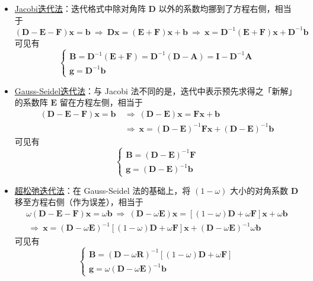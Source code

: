 \documentclass[opensource,b5paper,sourcefont]{qyxf-book}
\newcommand{\tl}{\setlength{\itemsep}{0pt}\setlength{\parskip}{0pt}}
\newcommand{\sothat}{\ \Rightarrow\ }
\renewcommand{\emph}[1]{\uline{#1}}
\begin{document}
\begin{itemize}\tl
    \item \emph{Jacobi迭代法}：迭代格式中除对角阵 $\mathbf{D}$ 以外的系数均挪到了方程右侧，相当于
    \[\mathbf{(D-E-F)x=b}\sothat\mathbf{Dx=(E+F)x+b}\sothat\mathbf{x=D}^{-1}\mathbf{(E+F)x+D}^{-1}\mathbf{b}\]
    可见有
    \begin{equation}
    \begin{cases}\mathbf{B=D}^{-1}\mathbf{(E+F)=D}^{-1}(\mathbf{D-A})=\mathbf{I-D}^{-1}\mathbf{A}\\\mathbf{g=D}^{-1}\mathbf{b}\end{cases}
    \end{equation}
    \item \emph{Gauss-Seidel迭代法}：与 Jacobi 法不同的是，迭代中表示预先求得之「新解」的系数阵 $\mathbf{E}$ 留在方程左侧，相当于
    \begin{align*}
    \mathbf{(D-E-F)x=b}&\sothat\mathbf{(D-E)x=Fx+b}\\&\sothat\mathbf{x=(D-E)}^{-1}\mathbf{Fx+(D-E)}^{-1}\mathbf{b}
    \end{align*}
    可见有
    \begin{equation}
    \begin{cases}
    \mathbf{B=(D-E)}^{-1}\mathbf{F}\\
    \mathbf{g=(D-E)}^{-1}\mathbf{b}
    \end{cases}
    \end{equation}
    \item \emph{超松弛迭代法}：在 Gauss-Seidel 法的基础上，将 $(1-\omega)$ 大小的对角系数 $\mathbf{D}$ 移至方程右侧（作为误差），相当于
    \begin{gather*}
    \omega\mathbf{(D-E-F)x}=\omega\mathbf{b}\sothat(\mathbf{D}-\omega\mathbf{E})\mathbf{x}=[(1-\omega)\mathbf{D}+\omega\mathbf{F}]\mathbf{x}+\omega\mathbf{b}\\
    \sothat\mathbf{x}=(\mathbf{D}-\omega\mathbf{E})^{-1}[(1-\omega)\mathbf{D}+\omega \mathbf{F}]\mathbf{x}+(\mathbf{D}-\omega\mathbf{E})^{-1}\omega\mathbf{b}
    \end{gather*}
    可见有
    \begin{equation}
    \begin{cases}
    \mathbf{B}=(\mathbf{D}-\omega\mathbf{R})^{-1}[(1-\omega)\mathbf{D}+\omega\mathbf{F}]\\
    \mathbf{g}=\omega(\mathbf{D}-\omega\mathbf{E})^{-1}\mathbf{b}
    \end{cases}
    \end{equation}
\end{itemize}
\end{document}
